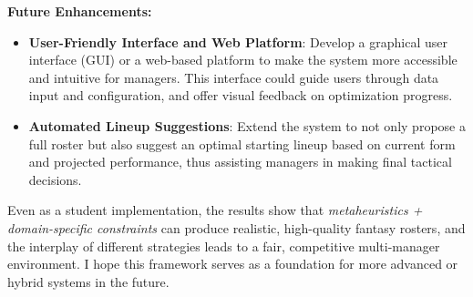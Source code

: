 \documentclass[sigconf]{acmart}
\begin{document}
\textbf{Future Enhancements:}
\begin{itemize}
	\item \textbf{User-Friendly Interface and Web Platform}: Develop a graphical user interface (GUI) or a web-based platform to make the system more accessible and intuitive for managers. This interface could guide users through data input and configuration, and offer visual feedback on optimization progress.
	\item \textbf{Automated Lineup Suggestions}: Extend the system to not only propose a full roster but also suggest an optimal starting lineup based on current form and projected performance, thus assisting managers in making final tactical decisions.
\end{itemize}

Even as a student implementation, the results show that \emph{metaheuristics + domain-specific constraints} can produce realistic, high-quality fantasy rosters, and the interplay of different strategies leads to a fair, competitive multi-manager environment. I hope this framework serves as a foundation for more advanced or hybrid systems in the future.

	
\end{document}
